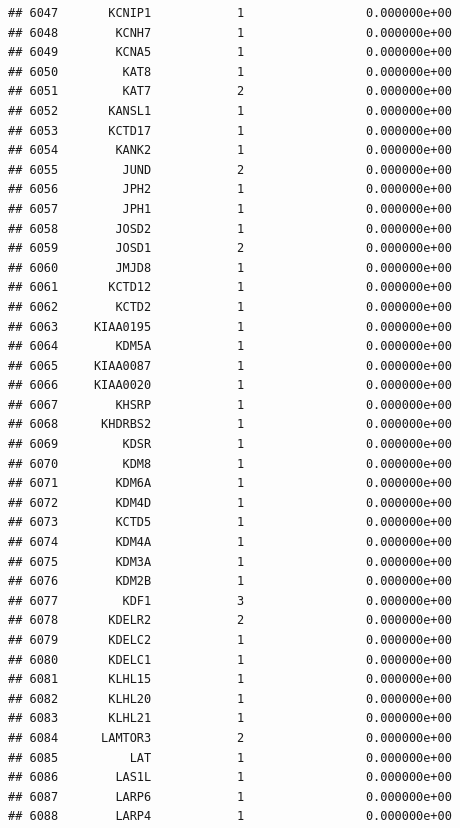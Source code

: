 \documentclass[
]{article}
\begin{document}
\begin{verbatim}
## 6047       KCNIP1            1                 0.000000e+00
## 6048        KCNH7            1                 0.000000e+00
## 6049        KCNA5            1                 0.000000e+00
## 6050         KAT8            1                 0.000000e+00
## 6051         KAT7            2                 0.000000e+00
## 6052       KANSL1            1                 0.000000e+00
## 6053       KCTD17            1                 0.000000e+00
## 6054        KANK2            1                 0.000000e+00
## 6055         JUND            2                 0.000000e+00
## 6056         JPH2            1                 0.000000e+00
## 6057         JPH1            1                 0.000000e+00
## 6058        JOSD2            1                 0.000000e+00
## 6059        JOSD1            2                 0.000000e+00
## 6060        JMJD8            1                 0.000000e+00
## 6061       KCTD12            1                 0.000000e+00
## 6062        KCTD2            1                 0.000000e+00
## 6063     KIAA0195            1                 0.000000e+00
## 6064        KDM5A            1                 0.000000e+00
## 6065     KIAA0087            1                 0.000000e+00
## 6066     KIAA0020            1                 0.000000e+00
## 6067        KHSRP            1                 0.000000e+00
## 6068      KHDRBS2            1                 0.000000e+00
## 6069         KDSR            1                 0.000000e+00
## 6070         KDM8            1                 0.000000e+00
## 6071        KDM6A            1                 0.000000e+00
## 6072        KDM4D            1                 0.000000e+00
## 6073        KCTD5            1                 0.000000e+00
## 6074        KDM4A            1                 0.000000e+00
## 6075        KDM3A            1                 0.000000e+00
## 6076        KDM2B            1                 0.000000e+00
## 6077         KDF1            3                 0.000000e+00
## 6078       KDELR2            2                 0.000000e+00
## 6079       KDELC2            1                 0.000000e+00
## 6080       KDELC1            1                 0.000000e+00
## 6081       KLHL15            1                 0.000000e+00
## 6082       KLHL20            1                 0.000000e+00
## 6083       KLHL21            1                 0.000000e+00
## 6084      LAMTOR3            2                 0.000000e+00
## 6085          LAT            1                 0.000000e+00
## 6086        LAS1L            1                 0.000000e+00
## 6087        LARP6            1                 0.000000e+00
## 6088        LARP4            1                 0.000000e+00

\end{verbatim}
\end{document}
